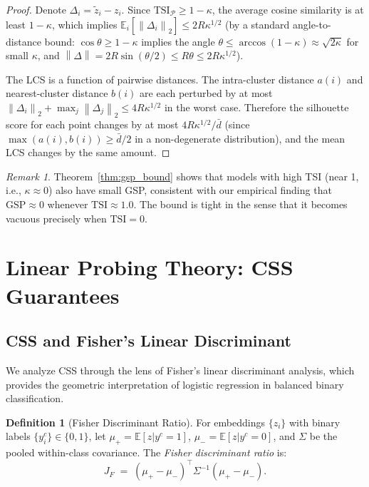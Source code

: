 \documentclass[12pt]{article}
\theoremstyle{definition}
\newtheorem{definition}[theorem]{Definition}
\theoremstyle{remark}
\newtheorem{remark}[theorem]{Remark}
\newcommand{\E}{\mathbb{E}}
\newcommand{\Pset}{\mathcal{P}}
\newcommand{\norm}[1]{\left\lVert #1 \right\rVert}
\newcommand{\tsi}{\mathrm{TSI}}
\newcommand{\gsp}{\mathrm{GSP}}
\begin{document}
\begin{proof}
Denote $\Delta_i = \tilde{z}_i - z_i$. Since $\tsi_\Pset \geq 1 - \kappa$,
the average cosine similarity is at least $1 - \kappa$, which implies
$\E_i[\norm{\Delta_i}_2] \leq 2R\kappa^{1/2}$ (by a standard angle-to-distance
bound: $\cos\theta \geq 1-\kappa$ implies the angle $\theta \leq \arccos(1-\kappa)
\approx \sqrt{2\kappa}$ for small $\kappa$, and $\norm{\Delta} = 2R\sin(\theta/2)
\leq R\theta \leq 2R\kappa^{1/2}$).

The LCS is a function of pairwise distances. The intra-cluster distance $a(i)$
and nearest-cluster distance $b(i)$ are each perturbed by at most
$\norm{\Delta_i}_2 + \max_j\norm{\Delta_j}_2 \leq 4R\kappa^{1/2}$ in the worst
case. Therefore the silhouette score for each point changes by at most
$4R\kappa^{1/2} / \bar{d}$ (since $\max(a(i), b(i)) \geq \bar{d}/2$ in a
non-degenerate distribution), and the mean LCS changes by the same amount.
\end{proof}

\begin{remark}
Theorem~\ref{thm:gsp_bound} shows that models with high TSI (near 1,
i.e., $\kappa \approx 0$) also have small GSP, consistent with our empirical
finding that $\gsp \approx 0$ whenever $\tsi \approx 1.0$. The bound is
tight in the sense that it becomes vacuous precisely when $\tsi = 0$.
\end{remark}

\section{Linear Probing Theory: CSS Guarantees}
\label{sec:probing_theory}

\subsection{CSS and Fisher's Linear Discriminant}

We analyze CSS through the lens of Fisher's linear discriminant analysis,
which provides the geometric interpretation of logistic regression in
balanced binary classification.

\begin{definition}[Fisher Discriminant Ratio]
\label{def:fisher}
For embeddings $\{z_i\}$ with binary labels $\{y^c_i\} \in \{0,1\}$,
let $\mu_+ = \E[z|y^c=1]$, $\mu_- = \E[z|y^c=0]$, and $\Sigma$ be the
pooled within-class covariance. The \emph{Fisher discriminant ratio} is:
\[
  J_F \;=\; (\mu_+ - \mu_-)^\top \Sigma^{-1} (\mu_+ - \mu_-).
\]
\end{definition}
\end{document}
